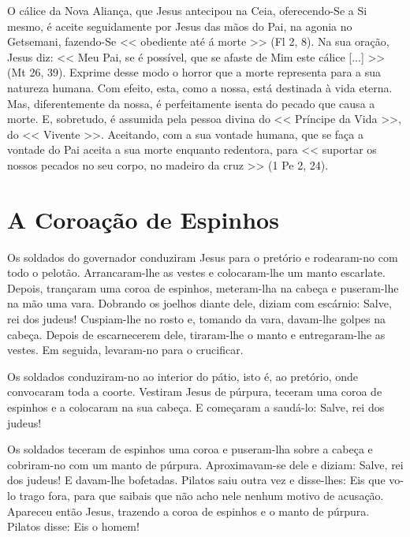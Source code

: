 \documentclass{rosario}
\begin{document}

O cálice da Nova Aliança, que Jesus antecipou na Ceia, oferecendo-Se a Si mesmo, é aceite seguidamente por Jesus das mãos do Pai, na agonia no Getsemani, fazendo-Se << obediente até á morte >> (Fl 2, 8).
Na sua oração, Jesus diz:
<< Meu Pai, se é possível, que se afaste de Mim este cálice [...] >> (Mt 26, 39).
Exprime desse modo o horror que a morte representa para a sua natureza humana.
Com efeito, esta, como a nossa, está destinada à vida eterna.
Mas, diferentemente da nossa, é perfeitamente isenta do pecado que causa a morte.
E, sobretudo, é assumida pela pessoa divina do << Príncipe da Vida >>, do << Vivente >>.
Aceitando, com a sua vontade humana, que se faça a vontade do Pai aceita a sua morte enquanto redentora, para << suportar os nossos pecados no seu corpo, no madeiro da cruz >> (1 Pe 2, 24).


\section{A Coroação de Espinhos}


Os soldados do governador conduziram Jesus para o pretório e rodearam-no com todo o pelotão.
Arrancaram-lhe as vestes e colocaram-lhe um manto escarlate.
Depois, trançaram uma coroa de espinhos, meteram-lha na cabeça e puseram-lhe na mão uma vara.
Dobrando os joelhos diante dele, diziam com escárnio:
Salve, rei dos judeus!
Cuspiam-lhe no rosto e, tomando da vara, davam-lhe golpes na cabeça.
Depois de escarnecerem dele, tiraram-lhe o manto e entregaram-lhe as vestes.
Em seguida, levaram-no para o crucificar.


Os soldados conduziram-no ao interior do pátio, isto é, ao pretório, onde convocaram toda a coorte.
Vestiram Jesus de púrpura, teceram uma coroa de espinhos e a colocaram na sua cabeça.
E começaram a saudá-lo: Salve, rei dos judeus!



Os soldados teceram de espinhos uma coroa e puseram-lha sobre a cabeça e cobriram-no com um manto de púrpura.
Aproximavam-se dele e diziam:
Salve, rei dos judeus! E davam-lhe bofetadas.
Pilatos saiu outra vez e disse-lhes:
Eis que vo-lo trago fora, para que saibais que não acho nele nenhum motivo de acusação.
Apareceu então Jesus, trazendo a coroa de espinhos e o manto de púrpura.
Pilatos disse:
Eis o homem!
\end{document}
